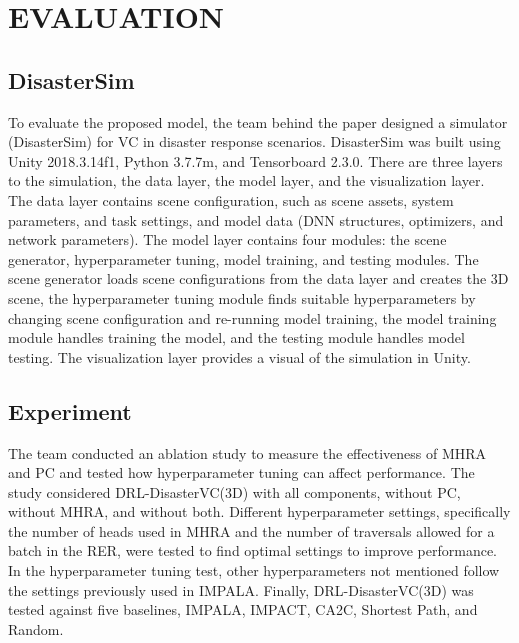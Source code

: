 \documentclass[sigconf, natbib=false]{acmart}
\begin{document}
   
   \section{EVALUATION}
   \subsection{DisasterSim}
   To evaluate the proposed model, the team behind the paper designed a simulator (DisasterSim) for VC in disaster response scenarios. DisasterSim was built using Unity 2018.3.14f1, Python 3.7.7m, and Tensorboard 2.3.0. There are three layers to the simulation, the data layer, the model layer, and the visualization layer. The data layer contains scene configuration, such as scene assets, system parameters, and task settings, and model data (DNN structures, optimizers, and network parameters). The model layer contains four modules: the scene generator, hyperparameter tuning, model training, and testing modules. The scene generator loads scene configurations from the data layer and creates the 3D scene, the hyperparameter tuning module finds suitable hyperparameters by changing scene configuration and re-running model training, the model training module handles training the model, and the testing module handles model testing. The visualization layer provides a visual of the simulation in Unity.
   
   \subsection{Experiment}
   The team conducted an ablation study to measure the effectiveness of MHRA and PC and tested how hyperparameter tuning can affect performance. The study considered DRL-DisasterVC(3D) with all components, without PC, without MHRA, and without both. Different hyperparameter settings, specifically the number of heads used in MHRA and the number of traversals allowed for a batch in the RER, were tested to find optimal settings to improve performance. In the hyperparameter tuning test, other hyperparameters not mentioned follow the settings previously used in IMPALA. Finally, DRL-DisasterVC(3D) was tested against five baselines, IMPALA, IMPACT, CA2C, Shortest Path, and Random.
   
\end{document}
